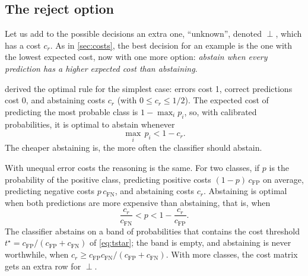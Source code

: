\subsection{The reject option}

Let us add to the possible decisions an extra one, ``unknown'', denoted $\perp$, which has a cost
$c_r$. As in \cref{sec:costs}, the best decision for an example is the one with the lowest
expected cost, now with one more option: \emph{abstain when every prediction has a higher
expected cost than abstaining}.

\citet{chow1970optimum} derived the optimal rule for the simplest case: errors cost 1, correct
predictions cost 0, and abstaining costs $c_r$ (with $0\leq c_r\leq1/2$). The expected cost of
predicting the most probable class is $1-\max_ip_i$, so, with calibrated probabilities, it is
optimal to abstain whenever
\begin{equation}\label{eq:chow}
  \max_i\,p_i<1-c_r .
\end{equation}
The cheaper abstaining is, the more often the classifier should abstain.

With unequal error costs the reasoning is the same. For two classes, if $p$ is the probability
of the positive class, predicting positive costs $(1-p)\,c_{\mathrm{FP}}$ on average, predicting
negative costs $p\,c_{\mathrm{FN}}$, and abstaining costs $c_r$. Abstaining is optimal when both
predictions are more expensive than abstaining, that is, when
\begin{equation}\label{eq:rejectband}
  \frac{c_r}{c_{\mathrm{FN}}}<p<1-\frac{c_r}{c_{\mathrm{FP}}}.
\end{equation}
The classifier abstains on a band of probabilities that contains the cost threshold
$t^\star=c_{\mathrm{FP}}/(c_{\mathrm{FP}}+c_{\mathrm{FN}})$ of \cref{eq:tstar}; the band is empty, and
abstaining is never worthwhile, when
$c_r\geq c_{\mathrm{FP}}c_{\mathrm{FN}}/(c_{\mathrm{FP}}+c_{\mathrm{FN}})$. With more classes, the cost
matrix gets an extra row for $\perp$.

